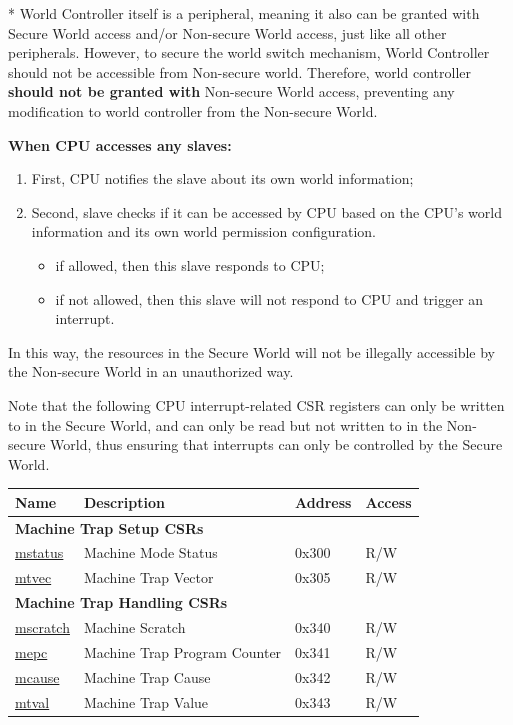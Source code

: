 \documentclass[main\_\_EN.tex]{subfiles}
\begin{document}
\begin{tiplisting}
\label{note:wctrl-access}
* World Controller itself is a peripheral, meaning it also can be granted with Secure World access and/or Non-secure World access, just like all other peripherals. However, to secure the world switch mechanism, World Controller should not be accessible from Non-secure world. Therefore, world controller \textbf{should not be granted with} Non-secure World access, preventing any modification to world controller from the Non-secure World.
\end{tiplisting}

\textbf{When CPU accesses any slaves:}

\begin{enumerate}
    \item First, CPU notifies the slave about its own world information;
    \item Second, slave checks if it can be accessed by CPU based on the CPU's world information and its own world permission configuration.
        \begin{itemize}
        \item if allowed, then this slave responds to CPU;
        \item if not allowed, then this slave will not respond to CPU and trigger an interrupt.
        \end{itemize}
\end{enumerate}
In this way, the resources in the Secure World will not be illegally accessible by the Non-secure World in an unauthorized way.

Note that the following CPU interrupt-related CSR registers can only be written to in the Secure World, and can only be read but not written to in the Non-secure World, thus ensuring that interrupts can only be controlled by the Secure World.


\begin{table}[H]
    \centering
    \begin{tabular}[c]{ | l | l | l | l | }
    \hline\rowcolor{lightgray}
    \textbf{Name} & \textbf{Description} & \textbf{Address} & \textbf{Access} \\ \hline
    \multicolumn{4}{|l|}{\textbf{Machine Trap Setup CSRs}} \\\hline
    \hyperref[regdesc:MSTATUS]{mstatus} & Machine Mode Status & 0x300 & R/W \\\hline
    
    \hyperref[regdesc:MTVEC]{mtvec} & Machine Trap Vector & 0x305 & R/W \\\hline
    \multicolumn{4}{|l|}{\textbf{Machine Trap Handling CSRs}} \\\hline
    \hyperref[regdesc:MSCRATCH]{mscratch} & Machine Scratch & 0x340 & R/W \\\hline
    \hyperref[regdesc:MEPC]{mepc} & Machine Trap Program Counter & 0x341 & R/W \\\hline
    \hyperref[regdesc:MCAUSE]{mcause} & Machine Trap Cause & 0x342 & R/W \\\hline
    \hyperref[regdesc:MTVAL]{mtval} & Machine Trap Value & 0x343 & R/W \\\hline   \end{tabular}
\end{table}
\end{document}
